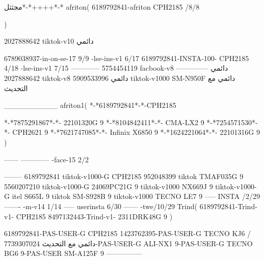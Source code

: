 مجثثل*-*++++*-*
afriton(
6189792841-afriton CPH2185  /8/8

)

2027888642 tiktok-v10
دائمي

6789038937-in-on-se-17 9/9
-lse-ins-v1 6/17
6189792841-INSTA-100- CPH2185 4/18
-lse-ins-v1 7/15
------------
5754454119 facbook-v8
دائمي
--------------
2027888642 tiktok-v8
دائمي
5909533996 tiktok-v1000  SM-N950F
دائمي مع التحديث

__________
afriton1(
*-*6189792841*-*-CPH2185

*-*7875291867*-*- 22101320G   9\2
*-*8104842411*-*- CMA-LX2   9\4
*-*7254571530*-*- CPH2621   9\6
*-*7621747085*-*- Infinix X6850   9\6
*-*1624221064*-*- 22101316G   9\9
)


------
------------
-face-15 2/2

--------
6189792841 tiktok-v1000-G CPH2185 
952048399 tiktok TMAF035G 9
5560207210 tiktok-v1000-G 24069PC21G  9 tiktok-v1000 NX669J  9 tiktok-v1000-G  itel S665L  9 tiktok  SM-S928B  9 tiktok-v1000  TECNO LE7  9\9
-----
 INSTA /2/29
-------
-m-v14 1/14
-----
userinsta 6/30
------
-twe/10/29
Trind(
6189792841-Trind-v1- CPH2185 
8497132443-Trind-v1- 2311DRK48G  9\5
)


6189792841-PAS-USER-G CPH2185 
1423762395-PAS-USER-G TECNO KJ6  /دائمي مع التحديث
7739307024-PAS-USER-G  ALI-NX1  9-PAS-USER-G  TECNO BG6  9-PAS-USER  SM-A125F  9\8
    ---------------
